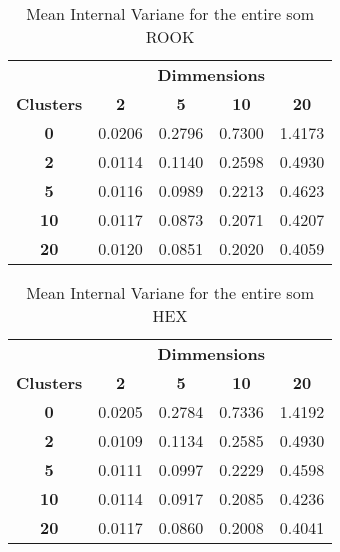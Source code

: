 \begin{table}
\centering
\caption{Mean Internal Variane for the entire som ROOK}
\label{ivtable2}
\begin{tabular}{|c||c|c|c|c|}
\hline
&\multicolumn{4}{c|}{\textbf{Dimmensions}}\\
\textbf{Clusters} & \multicolumn{1}{c}{\textbf{2}} &
\multicolumn{1}{c}{\textbf{5}} & \multicolumn{1}{c}{\textbf{10}} &
\multicolumn{1}{c|}{\textbf{20}}\\
\hline
\hline
\textbf{0} & 0.0206& 0.2796& 0.7300& 1.4173 \\
\hline
\textbf{2} & 0.0114& 0.1140& 0.2598& 0.4930 \\
\hline
\textbf{5} & 0.0116& 0.0989& 0.2213& 0.4623 \\
\hline
\textbf{10} & 0.0117& 0.0873& 0.2071& 0.4207 \\
\hline
\textbf{20} & 0.0120& 0.0851& 0.2020& 0.4059 \\
\hline
\end{tabular} \end{table}

\begin{table}
\caption{Mean Internal Variane for the entire som HEX}
\label{ivtablehex}
\begin{tabular}{|c||c|c|c|c|}
\hline
&\multicolumn{4}{c|}{\textbf{Dimmensions}}\\
\textbf{Clusters} & \multicolumn{1}{c}{\textbf{2}} &
\multicolumn{1}{c}{\textbf{5}} & \multicolumn{1}{c}{\textbf{10}} &
\multicolumn{1}{c|}{\textbf{20}}\\
\hline
\hline
\textbf{0} & 0.0205& 0.2784& 0.7336& 1.4192 \\
\hline
\textbf{2} & 0.0109& 0.1134& 0.2585& 0.4930 \\
\hline
\textbf{5} & 0.0111& 0.0997& 0.2229& 0.4598 \\
\hline
\textbf{10} & 0.0114& 0.0917& 0.2085& 0.4236 \\
\hline
\textbf{20} & 0.0117& 0.0860& 0.2008& 0.4041 \\
\hline
\end{tabular} \end{table}



